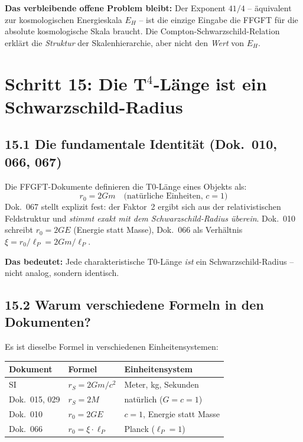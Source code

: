 \textbf{Das verbleibende offene Problem bleibt:}
Der Exponent $41/4$ -- äquivalent zur kosmologischen Energieskala $E_H$ --
ist die einzige Eingabe die FFGFT für die absolute kosmologische Skala
braucht. Die Compton-Schwarzschild-Relation erklärt die \emph{Struktur}
der Skalenhierarchie, aber nicht den \emph{Wert} von $E_H$.

\section{Schritt 15: Die T$^4$-Länge ist ein Schwarzschild-Radius}

\subsection*{15.1 Die fundamentale Identität (Dok.~010, 066, 067)}

Die FFGFT-Dokumente definieren die T0-Länge eines Objekts als:
\[
  r_0 = 2Gm \quad\text{(natürliche Einheiten, } c=1\text{)}
\]
Dok.~067 stellt explizit fest: der Faktor~2 ergibt sich aus der
relativistischen Feldstruktur und \emph{stimmt exakt mit dem
Schwarzschild-Radius überein}. Dok.~010 schreibt $r_0 = 2GE$
(Energie statt Masse), Dok.~066 als Verhältnis $\xi = r_0/\ell_P = 2Gm/\ell_P$.

\textbf{Das bedeutet:} Jede charakteristische T0-Länge \emph{ist}
ein Schwarzschild-Radius -- nicht analog, sondern identisch.

\subsection*{15.2 Warum verschiedene Formeln in den Dokumenten?}

Es ist dieselbe Formel in verschiedenen Einheitensystemen:

\begin{center}
\begin{tabular}{p{3cm}p{3.5cm}p{4.5cm}}
\toprule
\textbf{Dokument} & \textbf{Formel} & \textbf{Einheitensystem} \\
\midrule
SI & $r_S = 2Gm/c^2$ & Meter, kg, Sekunden \\
Dok.~015, 029 & $r_S = 2M$ & natürlich ($G=c=1$) \\
Dok.~010 & $r_0 = 2GE$ & $c=1$, Energie statt Masse \\
Dok.~066 & $r_0 = \xi\cdot\ell_P$ & Planck ($\ell_P=1$) \\
\bottomrule
\end{tabular}
\end{center}

